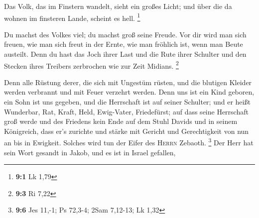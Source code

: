  Das Volk, das im Finstern wandelt, sieht ein großes
Licht; und über die da wohnen im finsteren Lande, scheint es hell.
\footnote{\textbf{9:1} Lk 1,79}

 Du machst des Volkes viel; du machst groß seine Freude.
Vor dir wird man sich freuen, wie man sich freut in der Ernte, wie man
fröhlich ist, wenn man Beute austeilt.  Denn du hast das
Joch ihrer Last und die Rute ihrer Schulter und den Stecken ihres
Treibers zerbrochen wie zur Zeit Midians. \footnote{\textbf{9:3} Ri 7,22}

 Denn alle Rüstung derer, die sich mit Ungestüm rüsten,
und die blutigen Kleider werden verbrannt und mit Feuer verzehrt werden.
 Denn uns ist ein Kind geboren, ein Sohn ist uns gegeben,
und die Herrschaft ist auf seiner Schulter; und er heißt Wunderbar, Rat,
Kraft, Held, Ewig-Vater, Friedefürst;  auf dass seine
Herrschaft groß werde und des Friedens kein Ende auf dem Stuhl Davids
und in seinem Königreich, dass er's zurichte und stärke mit Gericht und
Gerechtigkeit von nun an bis in Ewigkeit. Solches wird tun der Eifer des
\textsc{Herrn} Zebaoth. \footnote{\textbf{9:6} Jes 11,-1; Ps 72,3-4;
  2Sam 7,12-13; Lk 1,32}  Der Herr hat sein Wort gesandt
in Jakob, und es ist in Israel gefallen,

